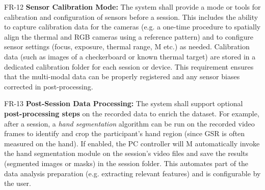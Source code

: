 \documentclass[11pt,a4paper]{report}
\begin{document}
  FR-12 \textbf{Sensor Calibration Mode:} The system shall provide a mode or tools
  for calibration and configuration of sensors before a session.  This includes the
  ability to capture calibration data for the cameras (e.g.  a one-time procedure to
  spatially align the thermal and RGB cameras using a reference pattern) and to
  configure sensor settings (focus, exposure, thermal range, M
                          etc.) as needed.  Calibration data (such as images of a
                          checkerboard or known thermal target) are stored in a
                          dedicated calibration folder for each session or
                          device\cite{StressDefinitionHH}\cite{CortisolStressIndicator2020}.
                          This requirement ensures that the multi-modal data can be
                          properly registered and any sensor biases corrected in
                          post-processing.

  FR-13 \textbf{Post-Session Data Processing:} The system shall support optional
  \textbf{post-processing steps} on the recorded data to enrich the dataset.  For
  example, after a session, a \textit{hand segmentation} algorithm can be run on the
  recorded video frames to identify and crop the participant's hand region (since GSR
  is often measured on the hand).  If enabled, the PC controller will M
                          automatically invoke the hand segmentation module on the
                          session's video files and save the results (segmented
                          images or masks) in the session
                          folder\cite{WHOStressDefinition}.  This automates part of
                          the data analysis preparation (e.g.  extracting relevant
                          features) and is configurable by the user.
\end{document}

